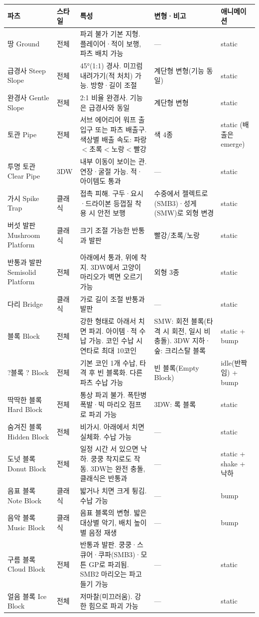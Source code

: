 \documentclass[10pt,a4paper]{article}
\begin{document}
\begin{longtable}{L{2.5cm} L{1.3cm} L{6.2cm} L{3.2cm} L{1.9cm}}
\toprule
\textbf{파츠} & \textbf{스타일} & \textbf{특성} & \textbf{변형·비고} & \textbf{애니메이션} \\
\midrule
\endhead
땅 Ground & 전체 & 파괴 불가 기본 지형. 플레이어·적이 보행, 파츠 배치 가능 & — & static \\
급경사 Steep Slope & 전체 & 45°(1:1) 경사. 미끄럼 내려가기(적 처치) 가능. 방향·길이 조절 & 계단형 변형(기능 동일) & static \\
완경사 Gentle Slope & 전체 & 2:1 비율 완경사. 기능은 급경사와 동일 & 계단형 변형 & static \\
토관 Pipe & 전체 & 서브 에어리어 워프 출입구 또는 파츠 배출구. 색상별 배출 속도: 파랑$<$초록$<$노랑$<$빨강 & 색 4종 & static (배출은 emerge) \\
투명 토관 Clear Pipe & 3DW & 내부 이동이 보이는 관. 연장·굴절 가능. 적·아이템도 통과 & — & static \\
가시 Spike Trap & 클래식 & 접촉 피해. 구두·요시·드라이본 등껍질 착용 시 안전 보행 & 수중에서 젤렉트로(SMB3)·성게(SMW)로 외형 변경 & static \\
버섯 발판 Mushroom Platform & 클래식 & 크기 조절 가능한 반통과 발판 & 빨강/초록/노랑 & static \\
반통과 발판 Semisolid Platform & 전체 & 아래에서 통과, 위에 착지. 3DW에서 고양이 마리오가 벽면 오르기 가능 & 외형 3종 & static \\
다리 Bridge & 클래식 & 가로 길이 조절 반통과 발판 & — & static \\
블록 Block & 전체 & 강한 형태로 아래서 치면 파괴. 아이템·적 수납 가능. 코인 수납 시 연타로 최대 10코인 & SMW: 회전 블록(타격 시 회전, 일시 비충돌). 3DW 지하·숲: 크리스탈 블록 & static + bump \\
?블록 ? Block & 전체 & 기본 코인 1개 수납, 타격 후 빈 블록화. 다른 파츠 수납 가능 & 빈 블록(Empty Block) & idle(반짝임) + bump \\
딱딱한 블록 Hard Block & 전체 & 통상 파괴 불가. 폭탄병 폭발·빅 마리오 점프로 파괴 가능 & 3DW: 록 블록 & static \\
숨겨진 블록 Hidden Block & 전체 & 비가시. 아래에서 치면 실체화. 수납 가능 & — & static \\
도넛 블록 Donut Block & 전체 & 일정 시간 서 있으면 낙하. 쿵쿵 착지로도 작동. 3DW는 완전 충돌, 클래식은 반통과 & — & static + shake + 낙하 \\
음표 블록 Note Block & 클래식 & 밟거나 치면 크게 튕김. 수납 가능 & — & bump \\
음악 블록 Music Block & 클래식 & 음표 블록의 변형. 밟은 대상별 악기, 배치 높이별 음정 재생 & — & bump \\
구름 블록 Cloud Block & 전체 & 반통과 발판. 쿵쿵·스큐어·쿠파(SMB3)·모튼 GP로 파괴됨. SMB2 마리오는 파고들기 가능 & — & static \\
얼음 블록 Ice Block & 전체 & 저마찰(미끄러움). 강한 힘으로 파괴 가능 & — & static \\
\bottomrule
\end{longtable}
\end{document}
